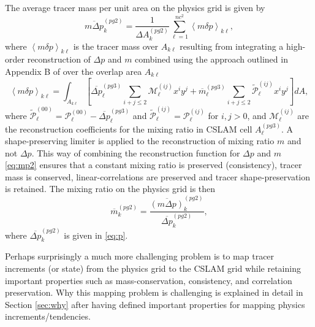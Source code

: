 The average tracer mass per unit area on the physics grid is given by
\begin{equation}
\label{eq:mp}
\overline{m\Delta p}^{(pg2)}_k=\frac{1}{\Delta A^{(pg2)}_k}\sum_{\ell=1}^{nc^2}\left< m\delta p\right>_{k\ell},
\end{equation}
where $\left< m\delta p\right>_{k\ell}$ is the tracer mass over $A_{k\ell}$ resulting from integrating a high-order reconstruction of $\Delta p$ and $m$ combined using the approach outlined in Appendix B of \cite{NL2010JCP} over the overlap area $A_{k\ell}$
\begin{equation}
\label{eq:mp2}
\left< m\delta p\right>_{k\ell}=\int_{A_{k\ell}}\left[ \overline{\Delta p}_\ell^{(pg3)}\sum_{i+j\le 2}{\mathcal{M}}^{(ij)}_\ell x^{i}y^{j}+{\overline{m}}_\ell^{(pg3)}\sum_{i+j\le 2}{\widetilde{{\mathcal{P}}}}^{(ij)}_\ell x^{i}y^{j}\right] dA,
\end{equation}
where ${\widetilde{{\mathcal{P}}}}^{(00)}_\ell={\mathcal{P}}^{(00)}_\ell-\overline{\Delta p}^{(pg3)}_\ell$ and ${\widetilde{{\mathcal{P}}}}^{(ij)}_\ell={\mathcal{P}}^{(ij)}_\ell$ for $i,j>0$, and ${\mathcal{M}}^{(ij)}_\ell$ are the reconstruction coefficients for the mixing ratio in CSLAM cell $A^{(pg3)}_\ell$. A shape-preserving limiter is applied to the reconstruction of mixing ratio $m$ \citep{BJ1989} and not $\Delta p$. This way of combining the reconstruction function for $\Delta p$ and $m$ \eqref{eq:mp2} ensures that a constant mixing ratio is preserved (consistency), tracer mass is conserved, linear-correlations are preserved and tracer shape-preservation is retained. The mixing ratio on the physics grid is then
\begin{equation}
{\overline{m}}^{(pg2)}_k=\frac{\overline{\left( m\Delta p\right)}^{(pg2)}_k}{\overline{\Delta p}^{(pg2)}_k},
\end{equation}
where $\overline{\Delta p}^{(pg2)}_k$ is given in \eqref{eq:p}. 

Perhaps surprisingly a much more challenging problem is to map tracer increments (or state) from the physics grid to the CSLAM grid while retaining important properties such as mass-conservation, consistency, and correlation preservation. Why this mapping problem is challenging is explained in detail in Section \ref{sec:why} after having defined important properties for mapping physics increments/tendencies.
